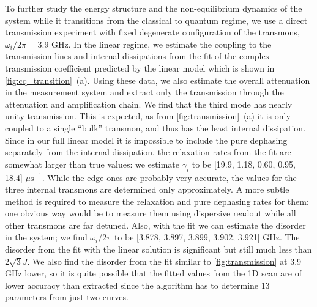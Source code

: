 \documentclass[%
 aps, pra,
 amsmath,amssymb,
 reprint,%
superscriptaddress
]{revtex4-2}
\begin{document}
To further study the energy structure and the non-equilibrium dynamics of the system while it transitions from the classical to quantum regime, we use a direct transmission experiment with fixed degenerate configuration of the transmons, $\omega_i/2\pi = 3.9$ GHz. In the linear regime, we estimate the coupling to the transmission lines and internal dissipations from the fit of the complex transmission coefficient predicted by the linear model which is shown in \autoref{fig:cq_transition}~(a). Using these data, we also estimate the overall attenuation in the measurement system and extract only the transmission through the attenuation and amplification chain. We find that the third mode has nearly unity transmission. This is expected, as from \autoref{fig:transmission}~(a) it is only coupled to a single ``bulk'' transmon, and thus has the least internal dissipation. Since in our full linear model it is impossible to include the pure dephasing separately from the internal dissipation, the relaxation rates from the fit are somewhat larger than true values: we estimate $\gamma_i$ to be [19.9, 1.18, 0.60, 0.95, 18.4] $\mu\text{s}^{-1}$. While the edge ones are probably very accurate, the values for the three internal transmons are determined only approximately. A more subtle method is required to measure the relaxation and pure dephasing rates for them: one obvious way would be to measure them using dispersive readout while all other transmons are far detuned. Also, with the fit we can estimate the disorder in the system; we find $\omega_i/2\pi$ to be [3.878, 3.897, 3.899, 3.902, 3.921] GHz. The disorder from the fit with the linear solution is significant but still much less than $2\sqrt{3}J$. We also find the disorder from the fit similar to \autoref{fig:transmission} at 3.9 GHz lower, so it is quite possible that the fitted values from the 1D scan are of lower accuracy than extracted since the algorithm has to determine 13 parameters from just two curves.
\end{document}
